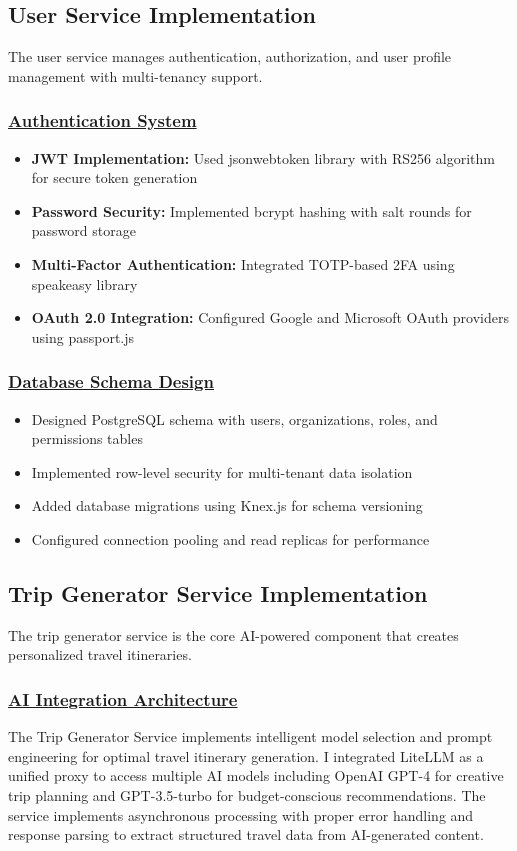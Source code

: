 \subsection{User Service Implementation}
The user service manages authentication, authorization, and user profile management with multi-tenancy support.

\subsubsection*{\underline{Authentication System}}
\begin{itemize}
    \item \textbf{JWT Implementation:} Used jsonwebtoken library with RS256 algorithm for secure token generation
    \item \textbf{Password Security:} Implemented bcrypt hashing with salt rounds for password storage
    \item \textbf{Multi-Factor Authentication:} Integrated TOTP-based 2FA using speakeasy library
    \item \textbf{OAuth 2.0 Integration:} Configured Google and Microsoft OAuth providers using passport.js
\end{itemize}

\subsubsection*{\underline{Database Schema Design}}
\begin{itemize}
    \item Designed PostgreSQL schema with users, organizations, roles, and permissions tables
    \item Implemented row-level security for multi-tenant data isolation
    \item Added database migrations using Knex.js for schema versioning
    \item Configured connection pooling and read replicas for performance
\end{itemize}

\subsection{Trip Generator Service Implementation}
The trip generator service is the core AI-powered component that creates personalized travel itineraries.

\subsubsection*{\underline{AI Integration Architecture}}
The Trip Generator Service implements intelligent model selection and prompt engineering for optimal travel itinerary generation. I integrated LiteLLM as a unified proxy to access multiple AI models including OpenAI GPT-4 for creative trip planning and GPT-3.5-turbo for budget-conscious recommendations. The service implements asynchronous processing with proper error handling and response parsing to extract structured travel data from AI-generated content.

